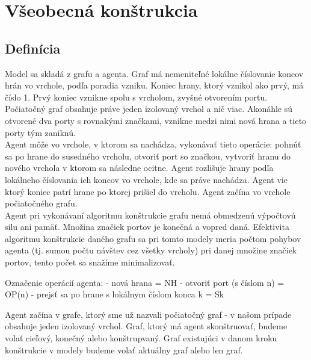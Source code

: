 

{}
{}
\chapter{Všeobecná konštrukcia}\label{chap:intro}

\section{Definícia}
\begin{defin}
Model sa skladá z grafu a agenta. Graf má nemeniteľné lokálne číslovanie koncov hrán vo
vrchole, podľa poradia vzniku. Koniec hrany, ktorý vznikol ako prvý, má
číslo 1. Prvý koniec vznikne spolu s vrcholom, zvyšné otvorením portu.
Počiatočný graf obsahuje práve jeden izolovaný vrchol a nič viac. Akonáhle
sú otvorené dva porty s rovnakými značkami, vznikne medzi nimi nová hrana a
tieto porty tým zaniknú.
\\
Agent môže vo vrchole, v ktorom sa nachádza, vykonávať tieto operácie: pohnúť sa po hrane do susedného
vrcholu, otvoriť port so značkou, vytvoriť hranu do nového vrchola v ktorom sa následne
ocitne. Agent rozlišuje hrany podľa lokálneho číslovania ich koncov vo
vrchole, kde sa práve nachádza. Agent vie ktorý koniec patrí hrane po ktorej
prišiel do vrcholu. Agent začína vo vrchole počiatočného grafu.
\\
Agent pri vykonávaní algoritmu konštrukcie grafu nemá obmedzenú výpočtovú
silu ani pamäť. Množina značiek portov je konečná a vopred daná. Efektivita
algoritmu konštrukcie daného grafu sa pri tomto modely meria počtom pohybov
agenta (tj. sumou počtu návštev cez všetky vrcholy) pri danej množine značiek
portov, tento počet sa snažíme minimalizovať.
\end{defin}

\begin{ozn}
Označenie operácií agenta:
- nová hrana = NH
- otvoriť port (s číslom n) = OP(n)
- prejsť sa po hrane s lokálnym číslom konca k = Sk
\end{ozn}

\begin{ozn}
Agent začína v grafe, ktorý sme už nazvali počiatočný graf - v našom prípade
obsahuje jeden izolovaný vrchol. Graf, ktorý má agent skonštruovať, budeme
volať cieľový, konečný alebo konštrupvaný. Graf existujúci v danom kroku
konštrukcie v modely budeme volať aktuálny graf alebo len graf.
\end{ozn}

